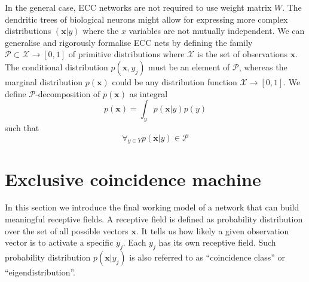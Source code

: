 \documentclass[12pt]{article}
\begin{document}
In the general case, ECC networks are not required to use weight matrix $W$. The dendritic trees of biological neurons might allow for expressing more complex distributions $(\boldsymbol{x}|y)$ where the $x$ variables are not mutually independent. We can generalise and rigorously formalise ECC nets by defining the family $\mathcal{P} \subset \mathcal{X} \rightarrow [0,1]$ of primitive distributions where $\mathcal{X}$ is the set of observations $\boldsymbol{x}$. The conditional distribution $p(\boldsymbol{x},y_j)$ must be an element of $\mathcal{P}$, whereas the marginal distribution $p(\boldsymbol{x})$ could be any distribution function $\mathcal{X} \rightarrow [0,1]$.  We define  $\mathcal{P}$-decomposition of $p(\boldsymbol{x})$ as integral
\[
p(\boldsymbol{x})= \int_y p(\boldsymbol{x}|y) p(y)
\]
such that
\[
\forall_{y\in Y} p(\boldsymbol{x}|y)  \in \mathcal{P} 
\]



\section{Exclusive coincidence machine}

In this section we introduce the final working model of a network that can build meaningful receptive fields. A receptive field is defined as probability distribution over the set of all possible vectors $\boldsymbol{x}$. It tells us how likely a given observation vector is to activate a specific $y_j$. Each $y_j$ has its own receptive field. Such probability distribution $p(\boldsymbol{x}|y_j)$ is also referred to as ``coincidence class'' or ``eigendistribution''. 
\end{document}
